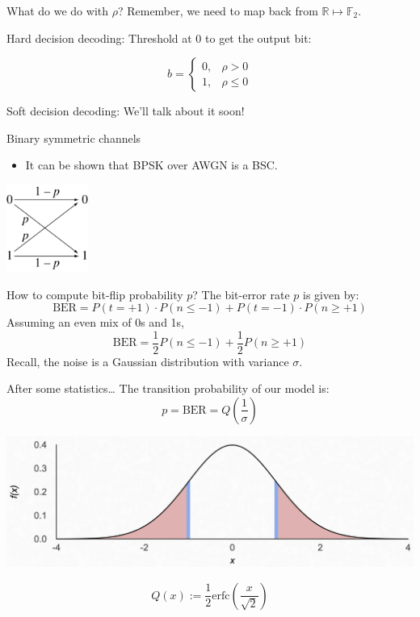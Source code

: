 \documentclass[aspectratio=1610, 10pt]{beamer}
\begin{document}
\begin{frame}[label={sec:orgc6ca06b}]{What do we do with \(\rho\)?}
Remember, we need to map back from \(\mathbb{R} \mapsto \mathbb{F}_2\).

\alert{Hard decision decoding:} Threshold at 0 to get the output bit:

$$b = \begin{cases} 0,& \rho > 0\\ 1,&\rho \leq 0\end{cases}$$

\alert{Soft decision decoding:} We'll talk about it soon!
\end{frame}

\begin{frame}[label={sec:orge9163c1}]{Binary symmetric channels}
\begin{itemize}
\item It can be shown that BPSK over AWGN is a BSC.
\end{itemize}

\begin{center}
\includegraphics[width=0.2\textwidth]{./bsc.png}
\end{center}
\end{frame}

\begin{frame}[label={sec:org537066a}]{How to compute bit-flip probability \(p\)?}
The bit-error rate \(p\) is given by:
$$\text{BER} = P(t = +1)\cdot P(n \leq -1) + P(t = -1)\cdot P(n \geq +1)$$
Assuming an even mix of 0s and 1s,
$$\text{BER} = \frac{1}{2} P(n \leq -1) + \frac{1}{2} P(n \geq +1)$$
Recall, the noise is a Gaussian distribution with variance \(\sigma\).
\end{frame}

\begin{frame}[label={sec:orgc599a74}]{After some statistics\ldots{}}
The transition probability of our model is:
$$p = \text{BER} = Q\left(\frac{1}{\sigma} \right)$$
\begin{center}
\includegraphics[width=.9\linewidth]{./gaussian_twoside.png}
\end{center}
$$Q(x) := \frac{1}{2} \text{erfc}\left(\frac{x}{\sqrt{2}} \right)$$
\end{frame}
\end{document}
